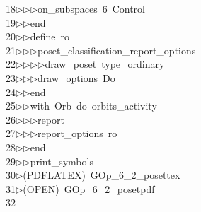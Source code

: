 \begin{tabbing}
18\>$\triangleright$\>$\triangleright$\>$\triangleright$\>on\_subspaces\ 6\ Control\ \\[0pt]
19\>$\triangleright$\>$\triangleright$\>end\ \\[0pt]
20\>$\triangleright$\>$\triangleright$\>define\ ro\ \\[0pt]
21\>$\triangleright$\>$\triangleright$\>$\triangleright$\>poset\_classification\_report\_options\ \\[0pt]
22\>$\triangleright$\>$\triangleright$\>$\triangleright$\>$\triangleright$\>draw\_poset\ type\_ordinary\ \\[0pt]
23\>$\triangleright$\>$\triangleright$\>$\triangleright$\>draw\_options\ Do\ \\[0pt]
24\>$\triangleright$\>$\triangleright$\>end\ \\[0pt]
25\>$\triangleright$\>$\triangleright$\>with\ Orb\ do\ orbits\_activity\ \\[0pt]
26\>$\triangleright$\>$\triangleright$\>$\triangleright$\>report\ \ \\[0pt]
27\>$\triangleright$\>$\triangleright$\>$\triangleright$\>report\_options\ ro\ \\[0pt]
28\>$\triangleright$\>$\triangleright$\>end\ \\[0pt]
29\>$\triangleright$\>$\triangleright$\>print\_symbols\\[0pt]
30\>$\triangleright$\>(PDFLATEX)\ GOp\_6\_2\_posettex\\[0pt]
31\>$\triangleright$\>(OPEN)\ GOp\_6\_2\_posetpdf\\[0pt]
32\>\end{tabbing}
